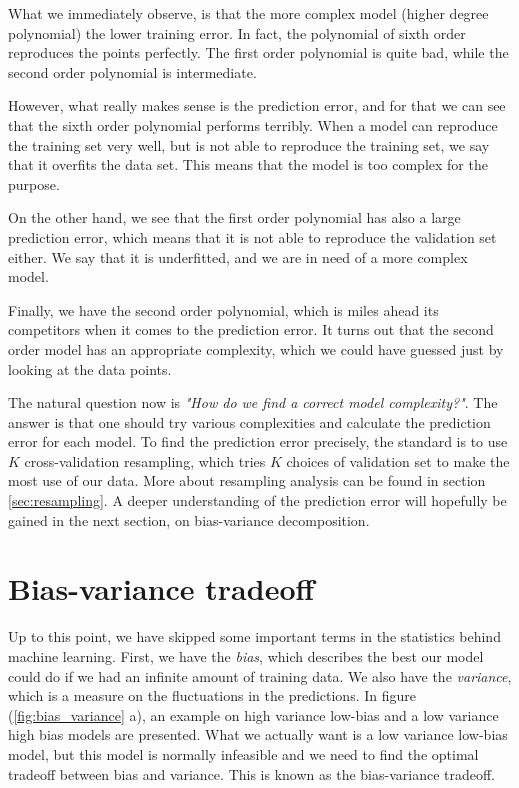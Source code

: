 What we immediately observe, is that the more complex model (higher degree polynomial) the lower training error. In fact, the polynomial of sixth order reproduces the points perfectly. The first order polynomial is quite bad, while the second order polynomial is intermediate.

However, what really makes sense is the prediction error, and for that we can see that the sixth order polynomial performs terribly. When a model can reproduce the training set very well, but is not able to reproduce the training set, we say that it overfits the data set. This means that the model is too complex for the purpose.

On the other hand, we see that the first order polynomial has also a large prediction error, which means that it is not able to reproduce the validation set either. We say that it is underfitted, and we are in need of a more complex model.

Finally, we have the second order polynomial, which is miles ahead its competitors when it comes to the prediction error. It turns out that the second order model has an appropriate complexity, which we could have guessed just by looking at the data points.

The natural question now is \textit{"How do we find a correct model complexity?"}. The answer is that one should try various complexities and calculate the prediction error for each model. To find the prediction error precisely, the standard is to use $K$ cross-validation resampling, which tries $K$ choices of validation set to make the most use of our data. More about resampling analysis can be found in section \eqref{sec:resampling}. A deeper understanding of the prediction error will hopefully be gained in the next section, on bias-variance decomposition. 

\section{Bias-variance tradeoff}
Up to this point, we have skipped some important terms in the statistics behind machine learning. First, we have the \textit{bias}, which describes the best our model could do if we had an infinite amount of training data. We also have the \textit{variance}, which is a measure on the fluctuations in the predictions. In figure (\ref{fig:bias_variance} a), an example on high variance low-bias and a low variance high bias models are presented. What we actually want is a low variance low-bias model, but this model is normally infeasible and we need to find the optimal tradeoff between bias and variance. This is known as the bias-variance tradeoff. 

